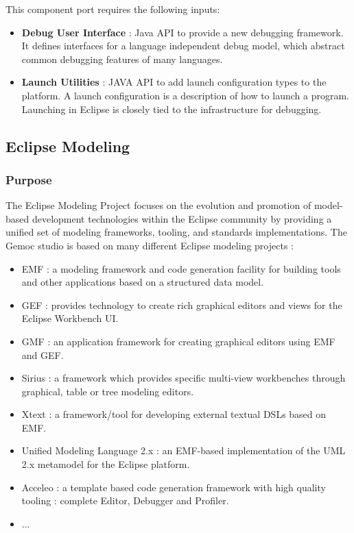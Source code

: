 \documentclass{gemoc} %
\begin{document}
This component port requires the following inputs:
\begin{itemize}
  \item \textbf{Debug User Interface} :
Java API to provide a new debugging framework. It defines interfaces for a language independent debug model, which abstract common debugging features of many languages. 
  \item \textbf{Launch Utilities} :
JAVA API to add launch configuration types to the platform. A launch configuration is a description of how to launch a program. Launching in Eclipse is closely tied to the infrastructure for debugging.
\end{itemize}



\subsection{Eclipse Modeling}


\subsubsection{Purpose}
The Eclipse Modeling Project focuses on the evolution and promotion of model-based development technologies within the Eclipse community by providing a unified set of modeling frameworks, tooling, and standards implementations. The Gemoc studio is based on many different Eclipse modeling projects :
\begin{itemize}
\item EMF : a modeling framework and code generation facility for building tools and other applications based on a structured data model.
\item GEF : provides technology to create rich graphical editors and views for the Eclipse Workbench UI.
\item GMF : an application framework for creating graphical editors using EMF and GEF.
\item Sirius : a framework which provides specific multi-view workbenches through graphical, table or tree modeling editors.
\item Xtext : a framework/tool for developing external textual DSLs based on EMF.
\item Unified Modeling Language 2.x : an EMF-based implementation of the UML 2.x metamodel for the Eclipse platform.
\item Acceleo : a template based code generation framework with high quality tooling : complete Editor, Debugger and Profiler.
\item ...
\end{itemize}
\end{document}
